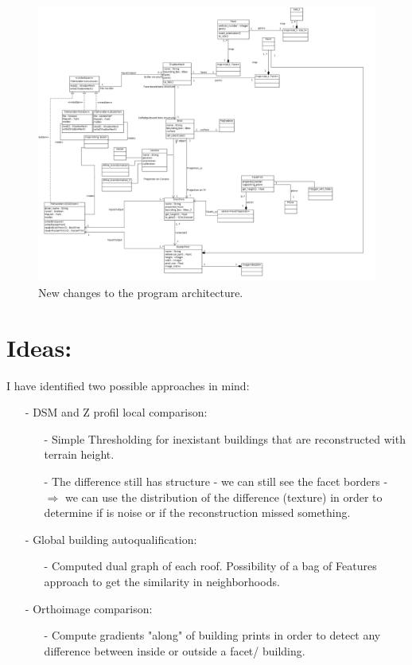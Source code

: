 \documentclass[a4paper, 11pt]{article}
\begin{document}
	\begin{figure}[H]
		\caption{\label{diag::class} New changes to the program architecture.}
		\includegraphics[scale=.27]{images/vectorial/class_diagram.png}
	\end{figure}
	
	\section*{Ideas:}
	I have identified two possible approaches in mind:
	\begin{itemize}
		\item[-] DSM and Z profil local comparison:
		\begin{itemize}
			\item[-] Simple Thresholding for inexistant buildings that are reconstructed with terrain height.
			\item[-] The difference still has structure - we can still see the facet borders - $\Rightarrow$ we can use the distribution of the difference (texture)  in order to determine if is noise or if the reconstruction missed something.
		\end{itemize}
		\item[-] Global building autoqualification:
		\begin{itemize}
			\item[-] Computed dual graph of each roof. Possibility of a bag of Features approach to get the similarity in neighborhoods.
		\end{itemize}
		
		\item[-] Orthoimage comparison:
		\begin{itemize}
			\item[-] Compute gradients "along" of building prints in order to detect any difference between inside or outside a facet/ building.
		\end{itemize}
	\end{itemize}
	
\end{document}
